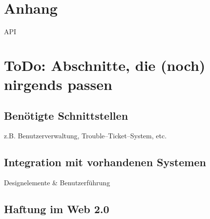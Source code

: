 \appendix
\section{Anhang} %
\label{sec:anhang}
\ac{API}


\section{ToDo: Abschnitte, die (noch) nirgends passen} %
\label{sec:noch_ein_anhang}


\subsection{Benötigte Schnittstellen} %
\label{sub:benotigte_schnittstellen}
z.B. Benutzerverwaltung, Trouble–Ticket–System, etc.

\subsection{Integration mit vorhandenen Systemen} %
\label{sub:integration_mit_vorhandenen_systemen}
Designelemente \& Benutzerführung

\subsection{Haftung im Web 2.0} %
\label{sub:haftung_im_web_2_0}




